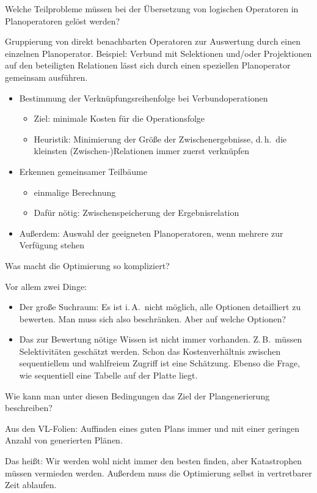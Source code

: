 	\item Welche Teilprobleme müssen bei der Übersetzung von logischen Operatoren in Planoperatoren gelöst werden?

\begin{solution}
Gruppierung von direkt benachbarten Operatoren zur Auswertung durch einen einzelnen Planoperator.
Beispiel: Verbund mit Selektionen und/oder Projektionen auf den beteiligten Relationen lässt sich durch einen speziellen Planoperator gemeinsam ausführen.
\begin{itemize}
	\item Bestimmung der Verknüpfungsreihenfolge bei Verbundoperationen
		\begin{itemize}
			\item Ziel: minimale Kosten für die Operationsfolge
			\item Heuristik: Minimierung der Größe der Zwischenergebnisse,
        d.\,h.\ die kleinsten (Zwischen-)Relationen immer zuerst verknüpfen
		\end{itemize}
	\item Erkennen gemeinsamer Teilbäume
		\begin{itemize}
			\item einmalige Berechnung
			\item Dafür nötig: Zwischenspeicherung der Ergebnisrelation
		\end{itemize}
	\item Außerdem: Auswahl der geeigneten Planoperatoren, wenn mehrere zur Verfügung stehen
	\end{itemize}
\end{solution}

	\item Was macht die Optimierung so kompliziert?

\begin{solution}
Vor allem zwei Dinge:
\begin{itemize}
	\item Der große Suchraum: Es ist i.\,A.\ nicht möglich, alle Optionen detailliert zu bewerten. Man muss sich also beschränken. Aber auf welche Optionen?
	\item Das zur Bewertung nötige Wissen ist nicht immer vorhanden. Z.\,B.\ müssen Selektivitäten geschätzt werden. Schon das Kostenverhältnis zwischen sequentiellem und wahlfreiem Zugriff ist eine Schätzung. Ebenso die Frage, wie sequentiell eine Tabelle auf der Platte liegt.
\end{itemize}
\end{solution}

	\item Wie kann man unter diesen Bedingungen das Ziel der Plangenerierung beschreiben?

\begin{solution}
Aus den VL-Folien: Auffinden eines guten Plans immer und mit einer geringen Anzahl von generierten Plänen.

Das heißt: Wir werden wohl nicht immer den besten finden, aber Katastrophen müssen vermieden werden. Außerdem muss die Optimierung selbst in vertretbarer Zeit ablaufen.
\end{solution}
